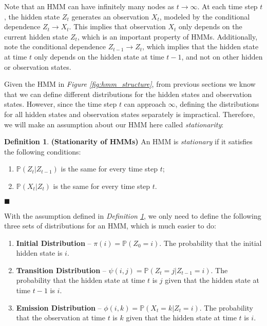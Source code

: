 \documentclass{article}
\theoremstyle{definition}
\newtheorem{definition}{Definition}
\newenvironment{definitionqed}
    {\begin{definition}}
    {\hfill \qedsymbol \end{definition}}
\renewcommand{\qedsymbol}{\(\blacksquare\)}
\renewcommand{\P}{\mathbb{P}}
\begin{document}
Note that an HMM can have infinitely many nodes as \(t \to \infty\). At each time step \(t\), the hidden state \(Z_t\) generates an observation \(X_t\), modeled by the conditional dependence \(Z_t \longrightarrow X_t\). This implies that observation \(X_t\) only depends on the current hidden state \(Z_t\), which is an important property of HMMs. Additionally, note the conditional dependence \(Z_{t-1} \longrightarrow Z_t\), which implies that the hidden state at time \(t\) only depends on the hidden state at time \(t-1\), and not on other hidden or observation states.

Given the HMM in \textit{Figure \ref{fig:hmm_structure}}, from previous sections we know that we can define different distributions for the hidden states and observation states. However, since the time step \(t\) can approach \(\infty\), defining the distributions for all hidden states and observation states separately is impractical. Therefore, we will make an assumption about our HMM here called \textit{stationarity}:

\begin{definitionqed} \label{def:stationarity}
    \textbf{(Stationarity of HMMs)} An HMM is \textit{stationary} if it satisfies the following conditions:
    \begin{enumerate}
        \item \(\P(Z_t | Z_{t-1})\) is the same for every time step \(t\);
        \item \(\P(X_t | Z_t)\) is the same for every time step \(t\).
    \end{enumerate}
\end{definitionqed}

With the assumption defined in \textit{Definition \ref{def:stationarity}}, we only need to define the following three sets of distributions for an HMM, which is much easier to do:

\begin{enumerate}
    \item \textbf{Initial Distribution} -- \(\pi(i) = \P(Z_0 = i)\). The probability that the initial hidden state is \(i\).
    \item \textbf{Transition Distribution} -- \(\psi(i, j) = \P(Z_t = j | Z_{t-1} = i)\). The probability that the hidden state at time \(t\) is \(j\) given that the hidden state at time \(t-1\) is \(i\).
    \item \textbf{Emission Distribution} -- \(\phi(i, k) = \P(X_t = k | Z_t = i)\). The probability that the observation at time \(t\) is \(k\) given that the hidden state at time \(t\) is \(i\).
\end{enumerate}
\end{document}
